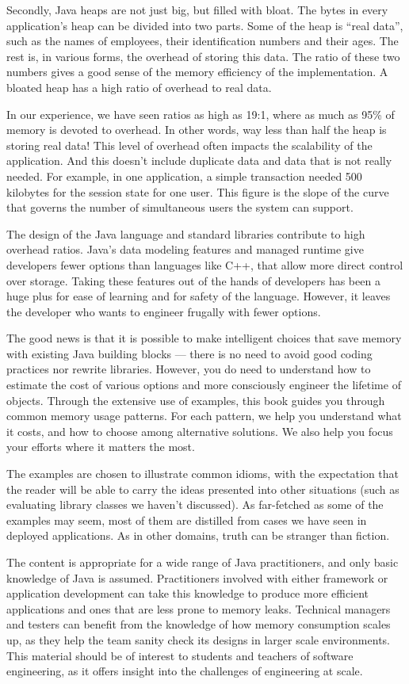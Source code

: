 Secondly, Java heaps
are not just big, but filled with bloat. The bytes in every application's heap can be divided into two
parts. Some of the heap is ``real data'', such as the names of employees, their
identification numbers and their ages. The rest is, in various forms, the
overhead of storing this data. The ratio of these two numbers gives a good sense of the
memory efficiency of the implementation. A bloated heap has a high ratio of
overhead to real data.

In our experience, we have seen ratios as high as 19:1, where as much as 95\%
of memory is devoted to overhead. In other words,
way less than half the heap is storing real data! This level of overhead often
impacts the scalability of the application. And this doesn't include duplicate
data and data that is not really needed. For example, in one application, a
simple transaction needed 500 kilobytes for the session state for one user. This
figure is the slope of the curve that governs the number of simultaneous users the system can support.  

The design of the Java language and standard libraries contribute to high
overhead ratios. Java's data modeling features and managed runtime give
developers fewer options than languages like C++, that allow more direct control over
storage. Taking these features out of the hands of developers has been a huge
plus for ease of learning and for safety of the language. However, it leaves the
developer who wants to engineer frugally with fewer options. 

The good news is that it is possible to make intelligent choices that save
memory with existing Java building blocks --- there is no need to avoid good
coding practices nor rewrite libraries. However, you do need to understand how
to estimate the cost of various options and more consciously engineer the
lifetime of objects. Through the extensive use of examples, this book guides you
through common memory usage patterns. For each pattern, we help you understand
what it costs, and how to choose among alternative solutions. We also help you
focus your efforts where it matters the most.

The examples are chosen to illustrate common idioms, with the expectation that
the reader will be able to carry the ideas presented into other situations
(such as evaluating library classes we haven't discussed). As far-fetched as
some of the examples may seem, most of them are distilled from cases we have seen 
in deployed applications. As in other domains, truth can be stranger than
fiction.

The content is appropriate for a wide range of Java practitioners, and only
basic knowledge of Java is assumed.
Practitioners involved with either framework or application development can
take this knowledge to produce more efficient applications and ones that are less prone to memory leaks.
Technical managers and testers can benefit from the knowledge of how memory
consumption scales up, as they help the team sanity check its designs in larger
scale environments. This material should be of interest to students and teachers
of software engineering, as it offers insight into the challenges of engineering 
at scale.


